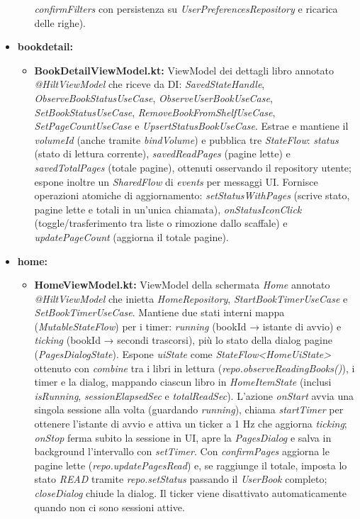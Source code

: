 \documentclass{article}
\begin{document}
\begin{itemize}
\begin{itemize}
    \textit{confirmFilters} con persistenza su \textit{UserPreferencesRepository} e ricarica delle righe).
  \end{itemize}
  \item \textbf{bookdetail:}
  \begin{itemize}
    \item \textbf{BookDetailViewModel.kt:} ViewModel dei dettagli libro annotato \textit{@HiltViewModel} che riceve da DI: \textit{SavedStateHandle}, \textit{ObserveBookStatusUseCase}, \textit{ObserveUserBookUseCase}, \textit{SetBookStatusUseCase}, \textit{RemoveBookFromShelfUseCase}, 
    \textit{SetPageCountUseCase} e \textit{UpsertStatusBookUseCase}. Estrae e mantiene il \textit{volumeId} (anche tramite \textit{bindVolume}) e pubblica tre \textit{StateFlow}: \textit{status} (stato di lettura corrente), \textit{savedReadPages} (pagine lette) e \textit{savedTotalPages} (totale pagine), 
    ottenuti osservando il repository utente; espone inoltre un \textit{SharedFlow} di \textit{events} per messaggi UI. Fornisce operazioni atomiche di aggiornamento: \textit{setStatusWithPages} (scrive stato, pagine lette e totali in un’unica chiamata), \textit{onStatusIconClick} (toggle/trasferimento tra liste o rimozione dallo scaffale) e \textit{updatePageCount} (aggiorna il totale pagine).
  \end{itemize}
  \item \textbf{home:}
  \begin{itemize}
    \item \textbf{HomeViewModel.kt:} ViewModel della schermata \emph{Home} annotato \textit{@HiltViewModel} che inietta \textit{HomeRepository}, \textit{StartBookTimerUseCase} e \textit{SetBookTimerUseCase}. Mantiene due stati interni mappa (\textit{MutableStateFlow}) per i timer: \emph{running} (bookId → istante di avvio) e \emph{ticking} (bookId → secondi trascorsi), più lo stato della dialog pagine (\textit{PagesDialogState}). 
    Espone \textit{uiState} come \textit{StateFlow<HomeUiState>} ottenuto con \textit{combine} tra i libri in lettura (\textit{repo.observeReadingBooks()}), i timer e la dialog, mappando ciascun libro in \textit{HomeItemState} (inclusi \emph{isRunning}, \emph{sessionElapsedSec} e \emph{totalReadSec}). L’azione \emph{onStart} avvia una singola sessione alla volta (guardando \emph{running}), chiama \textit{startTimer} 
    per ottenere l’istante di avvio e attiva un ticker a 1 Hz che aggiorna \emph{ticking}; \emph{onStop} ferma subito la sessione in UI, apre la \emph{PagesDialog} e salva in background l’intervallo con \textit{setTimer}. Con \emph{confirmPages} aggiorna le pagine lette (\textit{repo.updatePagesRead}) e, se raggiunge il totale, imposta lo stato \textit{READ} tramite \textit{repo.setStatus} passando il \textit{UserBook} completo; \emph{closeDialog} chiude la dialog. Il ticker viene disattivato automaticamente quando non ci sono sessioni attive.

\end{itemize}
\end{itemize}
\end{document}
